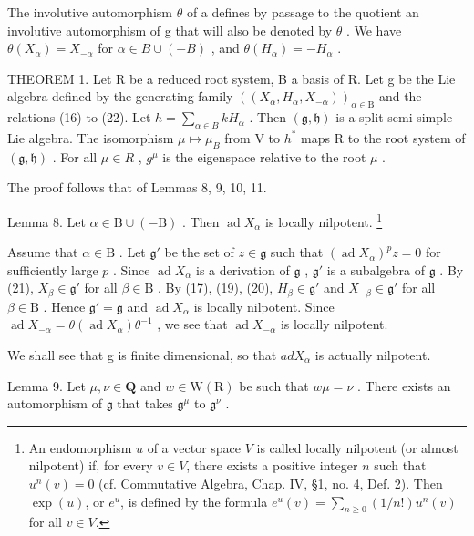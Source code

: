 The involutive automorphism \(\theta\) of a defines by passage to the quotient an involutive automorphism of g that will also be denoted by \(\theta\) . We have \(\theta(X_{\alpha}) = X_{-\alpha}\) for \(\alpha \in B \cup (-B)\) , and \(\theta(H_{\alpha}) = -H_{\alpha}\) .

THEOREM 1. Let R be a reduced root system, B a basis of R. Let g be the Lie algebra defined by the generating family \(((X_{\alpha}, H_{\alpha}, X_{-\alpha}))_{\alpha \in \mathrm{B}}\) and the relations (16) to (22). Let \(h = \sum_{\alpha \in B} kH_{\alpha}\) . Then \((\mathfrak{g}, \mathfrak{h})\) is a split semi-simple Lie algebra. The isomorphism \(\mu \mapsto \mu_{B}\) from V to \(h^{*}\) maps R to the root system of \((\mathfrak{g}, \mathfrak{h})\) . For all \(\mu \in R\) , \(g^{\mu}\) is the eigenspace relative to the root \(\mu\) .

The proof follows that of Lemmas 8, 9, 10, 11.

Lemma 8. Let \(\alpha \in \mathrm{B} \cup (-\mathrm{B})\) . Then \(\operatorname{ad} X_{\alpha}\) is locally nilpotent. \footnote{An endomorphism \(u\) of a vector space \(V\) is called locally nilpotent (or almost nilpotent) if, for every \(v \in V\), there exists a positive integer \(n\) such that \(u^n(v) = 0\) (cf. Commutative Algebra, Chap. IV, §1, no. 4, Def. 2). Then \(\exp(u)\), or \(e^u\), is defined by the formula \(e^u(v) = \sum_{n \geq 0} (1/n!)u^n(v)\) for all \(v \in V\).}

Assume that \(\alpha \in \mathrm{B}\) . Let \(\mathfrak{g}'\) be the set of \(z \in \mathfrak{g}\) such that \((\operatorname{ad} X_{\alpha})^p z = 0\) for sufficiently large \(p\) . Since \(\operatorname{ad} X_{\alpha}\) is a derivation of \(\mathfrak{g}\) , \(\mathfrak{g}'\) is a subalgebra of \(\mathfrak{g}\) . By (21), \(X_{\beta} \in \mathfrak{g}'\) for all \(\beta \in \mathrm{B}\) . By (17), (19), (20), \(H_{\beta} \in \mathfrak{g}'\) and \(X_{-\beta} \in \mathfrak{g}'\) for all \(\beta \in \mathrm{B}\) . Hence \(\mathfrak{g}' = \mathfrak{g}\) and \(\operatorname{ad} X_{\alpha}\) is locally nilpotent. Since \(\operatorname{ad} X_{-\alpha} = \theta (\operatorname{ad} X_{\alpha})\theta^{-1}\) , we see that \(\operatorname{ad} X_{-\alpha}\) is locally nilpotent.

We shall see that g is finite dimensional, so that \(ad X_{\alpha}\) is actually nilpotent.

Lemma 9. Let \(\mu, \nu \in \mathbf{Q}\) and \(w \in \mathrm{W}(\mathrm{R})\) be such that \(w\mu = \nu\) . There exists an automorphism of \(\mathfrak{g}\) that takes \(\mathfrak{g}^{\mu}\) to \(\mathfrak{g}^{\nu}\) .

